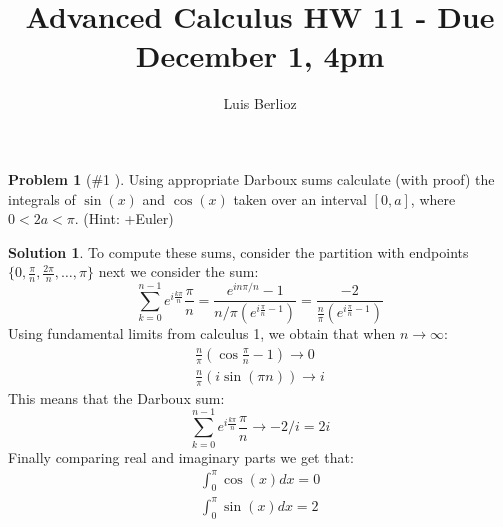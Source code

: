 \documentclass{article}
\theoremstyle{definition}
\newtheorem*{soln}{Solution}
\newtheorem*{prob}{Problem}
\theoremstyle{theorem}
\begin{document}
\title{Advanced Calculus HW 11 - Due December 1, 4pm}
\author{Luis Berlioz}
\maketitle


\begin{prob}[\#1 ]
     Using appropriate Darboux sums calculate (with proof) the  integrals of
$\sin(x)$ and $\cos(x)$ taken over an interval $[0, a]$, where $0 < 2a < \pi$.  (Hint: +Euler)
\end{prob}
\begin{soln}
    To compute these sums, consider the partition with endpoints $\{0,\frac \pi n, \frac {2\pi}n, \ldots , \pi\}$ next we consider the sum:
    $$\sum_{k=0 }^{n-1 }e^{i\frac {k\pi}n }\frac \pi n = \frac {e^{i n\pi/n }-1}{n/\pi(e^{i\frac \pi n -1 })} = \frac {-2}{\frac n\pi(e^{i\frac \pi n -1 })} $$
    Using fundamental limits from calculus 1, we obtain that when $n\to \infty$:
    \begin{gather}
        \frac n\pi (\cos\frac \pi n - 1) \to 0\\
        \frac n\pi (i\sin(\pi n)) \to i
    \end{gather}
    This means that the Darboux sum:
$$\sum_{k=0 }^{n-1 }e^{i\frac {k\pi}n }\frac \pi n \to -2/i =2i$$
Finally comparing real and imaginary parts we get that:
    \begin{gather}
        \int_0^\pi \cos(x)dx = 0\\
        \int_0^\pi \sin(x) dx = 2
    \end{gather}

\end{soln}
\end{document}
